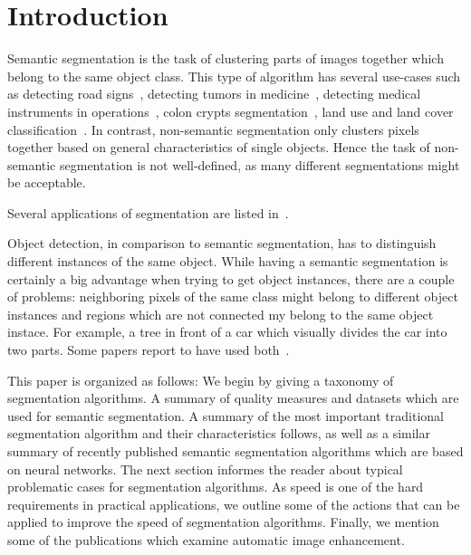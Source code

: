 \section{Introduction}\label{sec:introduction}
Semantic segmentation is the task of clustering parts of images together which
belong to the same object class. This type of algorithm has several use-cases
such as detecting road %
signs~\cite{4220659}, detecting tumors in medicine~\cite{moon2002automatic},
detecting medical instruments in operations~\cite{wei1997automatic}, colon
crypts segmentation~\cite{cohen2015memory}, land use and land cover
classification~\cite{huang2002assessment}. In contrast, non-semantic
segmentation only clusters pixels together based on general characteristics of
single objects. Hence the task of non-semantic segmentation is not
well-defined, as many different segmentations might be acceptable.

Several applications of segmentation are listed
in~\cite{annurev.bioeng.2.1.315}.

Object detection, in comparison to semantic segmentation, has to distinguish
different instances of the same object. While having a semantic segmentation is
certainly a big advantage when trying to get object instances, there are a
couple of problems: neighboring pixels of the same class might belong to
different object instances and regions which are not connected my belong to the
same object instace. For example, a tree in front of a car which visually
divides the car into two parts. Some papers report to have used
both~\cite{tighe2014scene}.



This paper is organized as follows: We begin by giving a taxonomy of
segmentation algorithms. %
A summary of quality measures and datasets which are used for semantic
segmentation. A summary of the most important traditional segmentation
algorithm and their characteristics follows, as well as a similar summary of
recently published semantic segmentation algorithms which are based on neural
networks. The next section informes the reader about typical problematic cases
for segmentation algorithms. As speed is one of the hard requirements in
practical applications, we outline some of the actions that can be applied to
improve the speed of segmentation algorithms. Finally, we mention some of the
publications which examine automatic image enhancement.
